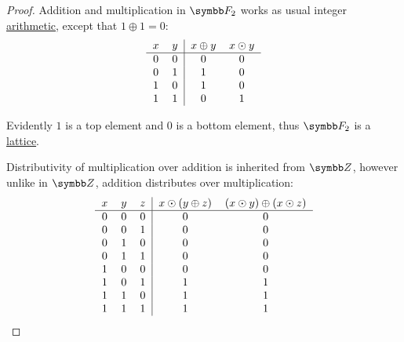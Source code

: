 \begin{proof}
  Addition and multiplication in \( \BF_2 \) works as usual integer \hyperref[def:integers]{arithmetic}, except that \( 1 \oplus 1 = 0 \):
  \begin{equation*}
    \begin{tabular}{c c | c c}
      \( x \) & \( y \) & \( x \oplus y \) & \( x \odot y \) \\
      \hline
      \( 0 \) & \( 0 \) & \( 0 \)          & \( 0 \)         \\
      \( 0 \) & \( 1 \) & \( 1 \)          & \( 0 \)         \\
      \( 1 \) & \( 0 \) & \( 1 \)          & \( 0 \)         \\
      \( 1 \) & \( 1 \) & \( 0 \)          & \( 1 \)
    \end{tabular}
  \end{equation*}

  Evidently \( 1 \) is a top element and \( 0 \) is a bottom element, thus \( \BF_2 \) is a \hyperref[def:lattice]{lattice}.

  Distributivity of multiplication over addition is inherited from \( \BZ \), however unlike in \( \BZ \), addition distributes over multiplication:
  \begin{equation*}
    \begin{tabular}{c c c | c c}
      \( x \) & \( y \) & \( z \) & \(x \odot (y \oplus z) \) & \( (x \odot y) \oplus (x \odot z) \) \\
      \hline
      \( 0 \) & \( 0 \) & \( 0 \) & \( 0 \)                   & \( 0 \)                              \\
      \( 0 \) & \( 0 \) & \( 1 \) & \( 0 \)                   & \( 0 \)                              \\
      \( 0 \) & \( 1 \) & \( 0 \) & \( 0 \)                   & \( 0 \)                              \\
      \( 0 \) & \( 1 \) & \( 1 \) & \( 0 \)                   & \( 0 \)                              \\
      \( 1 \) & \( 0 \) & \( 0 \) & \( 0 \)                   & \( 0 \)                              \\
      \( 1 \) & \( 0 \) & \( 1 \) & \( 1 \)                   & \( 1 \)                              \\
      \( 1 \) & \( 1 \) & \( 0 \) & \( 1 \)                   & \( 1 \)                              \\
      \( 1 \) & \( 1 \) & \( 1 \) & \( 1 \)                   & \( 1 \)
    \end{tabular}
  \end{equation*}


\end{proof}
